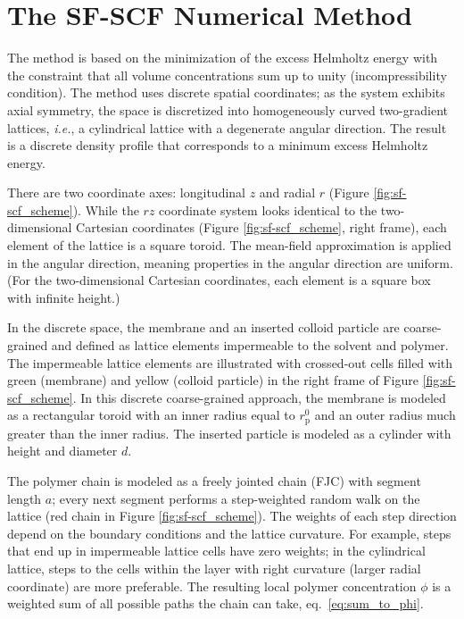 \documentclass[10pt, a4paper]{article}
\begin{document}
\section{The SF-SCF Numerical Method}
\begin{multicols}{2}

The method is based on the minimization of the excess Helmholtz energy with the constraint that all volume concentrations sum up to unity (incompressibility condition).
The method uses discrete spatial coordinates; as the system exhibits axial symmetry, the space is discretized into homogeneously curved two-gradient lattices, \emph{i.e.}, a cylindrical lattice with a degenerate angular direction.
The result is a discrete density profile that corresponds to a minimum excess Helmholtz energy.

There are two coordinate axes: longitudinal $z$ and radial $r$ (Figure \ref{fig:sf-scf_scheme}).
While the $rz$ coordinate system looks identical to the two-dimensional Cartesian coordinates (Figure \ref{fig:sf-scf_scheme}, right frame), each element of the lattice is a square toroid.
The mean-field approximation is applied in the angular direction, meaning properties in the angular direction are uniform.
(For the two-dimensional Cartesian coordinates, each element is a square box with infinite height.)

In the discrete space, the membrane and an inserted colloid particle are coarse-grained and defined as lattice elements impermeable to the solvent and polymer.
The impermeable lattice elements are illustrated with crossed-out cells filled with green (membrane) and yellow (colloid particle) in the right frame of Figure \ref{fig:sf-scf_scheme}.
In this discrete coarse-grained approach, the membrane is modeled as a rectangular toroid with an inner radius equal to $r_{\text{p}}^{0}$ and an outer radius much greater than the inner radius.
The inserted particle is modeled as a cylinder with height and diameter $d$.

The polymer chain is modeled as a freely jointed chain (FJC) with segment length $a$; every next segment performs a step-weighted random walk on the lattice (red chain in Figure \ref{fig:sf-scf_scheme}).
The weights of each step direction depend on the boundary conditions and the lattice curvature.
For example, steps that end up in impermeable lattice cells have zero weights; in the cylindrical lattice, steps to the cells within the layer with right curvature (larger radial coordinate) are more preferable.
The resulting local polymer concentration $\phi$ is a weighted sum of all possible paths the chain can take, eq.~\ref{eq:sum_to_phi}.


\end{multicols}
\end{document}
